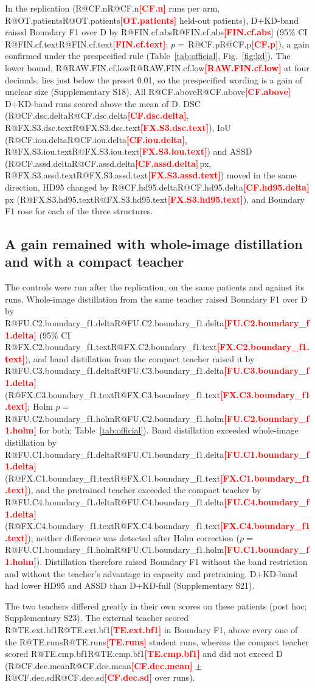 \documentclass[fleqn,10pt,lineno]{wlpeerj}
\makeatletter
\newcommand{\R}[1]{\ifcsname R@#1\endcsname\csname R@#1\endcsname\else\textbf{\textcolor{red}{[#1]}}\fi}
\makeatother
\begin{document}
In the replication (\R{CF.n} runs per arm, \R{OT.patients} held-out patients), D+KD-band raised Boundary F1 over D by \R{FIN.cf.abs} (95\% CI \R{FIN.cf.text}; $p=$\,\R{CF.p}), a gain confirmed under the prespecified rule (Table~\ref{tab:official}, Fig.~\ref{fig:kd}). The lower bound, \R{RAW.FIN.cf.low} at four decimals, lies just below the preset 0.01, so the prespecified wording is a gain of unclear size (Supplementary S18). All \R{CF.above} D+KD-band runs scored above the mean of D. DSC (\R{CF.dsc.delta}, \R{FX.S3.dsc.text}), IoU (\R{CF.iou.delta}, \R{FX.S3.iou.text}) and ASSD (\R{CF.assd.delta}\,px, \R{FX.S3.assd.text}) moved in the same direction, HD95 changed by \R{CF.hd95.delta}\,px (\R{FX.S3.hd95.text}), and Boundary F1 rose for each of the three structures.

\subsection*{A gain remained with whole-image distillation and with a compact teacher}
The controls were run after the replication, on the same patients and against its runs. Whole-image distillation from the same teacher raised Boundary F1 over D by \R{FU.C2.boundary_f1.delta} (95\% CI \R{FX.C2.boundary_f1.text}), and band distillation from the compact teacher raised it by \R{FU.C3.boundary_f1.delta} (\R{FX.C3.boundary_f1.text}; Holm $p=$\,\R{FU.C2.boundary_f1.holm} for both; Table~\ref{tab:official}). Band distillation exceeded whole-image distillation by \R{FU.C1.boundary_f1.delta} (\R{FX.C1.boundary_f1.text}), and the pretrained teacher exceeded the compact teacher by \R{FU.C4.boundary_f1.delta} (\R{FX.C4.boundary_f1.text}); neither difference was detected after Holm correction ($p=$\,\R{FU.C1.boundary_f1.holm}). Distillation therefore raised Boundary F1 without the band restriction and without the teacher's advantage in capacity and pretraining. D+KD-band had lower HD95 and ASSD than D+KD-full (Supplementary S21).

The two teachers differed greatly in their own scores on these patients (post hoc; Supplementary S23). The external teacher scored \R{TE.ext.bf1} in Boundary F1, above every one of the \R{TE.runs} student runs, whereas the compact teacher scored \R{TE.cmp.bf1} and did not exceed D (\R{CF.dec.mean} $\pm$ \R{CF.dec.sd} over runs).

\begin{table}[!tb]
\centering

\caption{\label{tab:official}Official ACDC test patients 101--150: Boundary F1 contrasts (primary) with DSC and HD95 (secondary, descriptive; [95\% CI] on the second line); $\Delta$ is the first arm minus the second. All rows use the same \R{OT.patients} patients, and the exploratory rows were analysed after the replication. Arm means and all metrics: Supplementary S18, S21.}
\end{table}
\end{document}
